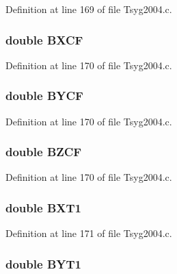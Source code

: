 Definition at line 169 of file Tsyg2004.c.\hypertarget{struct___t_s04_info_66bc2a288fcf9f7bae6e3993d43c458b}{
\subsubsection[{BXCF}]{\setlength{\rightskip}{0pt plus 5cm}double {\bf BXCF}}}
\label{struct___t_s04_info_66bc2a288fcf9f7bae6e3993d43c458b}




Definition at line 170 of file Tsyg2004.c.\hypertarget{struct___t_s04_info_721507c5ab1a75d3c249379bed1216a4}{
\subsubsection[{BYCF}]{\setlength{\rightskip}{0pt plus 5cm}double {\bf BYCF}}}
\label{struct___t_s04_info_721507c5ab1a75d3c249379bed1216a4}




Definition at line 170 of file Tsyg2004.c.\hypertarget{struct___t_s04_info_af933c557e7b42b1650d06a878927f39}{
\subsubsection[{BZCF}]{\setlength{\rightskip}{0pt plus 5cm}double {\bf BZCF}}}
\label{struct___t_s04_info_af933c557e7b42b1650d06a878927f39}




Definition at line 170 of file Tsyg2004.c.\hypertarget{struct___t_s04_info_a011d036e79b3e14b9894501557ceb2e}{
\subsubsection[{BXT1}]{\setlength{\rightskip}{0pt plus 5cm}double {\bf BXT1}}}
\label{struct___t_s04_info_a011d036e79b3e14b9894501557ceb2e}




Definition at line 171 of file Tsyg2004.c.\hypertarget{struct___t_s04_info_bed0b3a68e5e58be6d03ec0d6b2d4bac}{
\subsubsection[{BYT1}]{\setlength{\rightskip}{0pt plus 5cm}double {\bf BYT1}}}
\label{struct___t_s04_info_bed0b3a68e5e58be6d03ec0d6b2d4bac}




